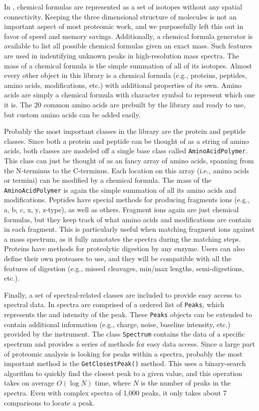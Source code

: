 In \csmsl{}, chemical formulas are represented as a set of isotopes without any spatial connectivity. Keeping the three dimensional structure of molecules is not an important aspect of most proteomic work, and we purposefully left this out in favor of speed and memory savings. Additionally, a chemical formula generator is available to list all possible chemical formulas given an exact mass. Such features are used in indentifying unknown peaks in high-resolution mass spectra. The mass of a chemical formula is the simple summation of all of its isotopes. Almost every other object in this library is a chemical formula (e.g., proteins, peptides, amino acids, modifications, etc.)  with additional properties of its own. Amino acids are simply a chemical formula with character symbol to represent which one it is. The 20 common amino acids are prebuilt by the library and ready to use, but custom amino acids can be added easily.

Probably the most important classes in the library are the protein and peptide classes. Since both a protein and peptide can be thought of as a string of amino acids, both classes are modeled off a single base class called \texttt{AminoAcidPolymer}. This class can just be thought of as an fancy array of amino acids, spanning from the N-terminus to the C-terminus. Each location on this array (i.e., amino acids or termini) can be modified by a chemical formula. The mass of the \texttt{AminoAcidPolymer} is again the simple summation of all its amino acids and modifications. Peptides have special methods for producing fragments ions (e.g., a, b, c, x, y, z-type), as well as others. Fragment ions again are just chemical formulas, but they keep track of what amino acids and modifications are contain in each fragment. This is particularly useful when matching fragment ions against a mass spectrum, as it fully annotates the spectra during the matching steps. Proteins have methods for proteolytic digestion by any enzyme. Users can also define their own proteases to use, and they will be compatible with all the features of digestion (e.g., missed cleavages, min/max lengths, semi-digestions, etc.).

Finally, a set of spectral-related classes are included to provide easy access to spectral data. In \csmsl{} spectra are comprised of a ordered list of \texttt{Peaks}, which represents the \mz{} and intensity of the peak. These \texttt{Peaks} objects can be extended to contain additional information (e.g., charge, noise, baseline intensity, etc.) provided by the instrument. The class \texttt{Spectrum} contains the data of a specific spectrum and provides a series of methods for easy data access. Since a large part of proteomic analysis is looking for peaks within a spectra, probably the most important method is the \texttt{GetClosestPeak()} method. This uses a binary-search algorithm to quickly find the closest peak to a given \mz{} value, and this operation takes on average $O(\log N)$ time, where $N$ is the number of peaks in the spectra. Even with complex spectra of 1,000 peaks, it only takes about 7 comparisons to locate a peak.

